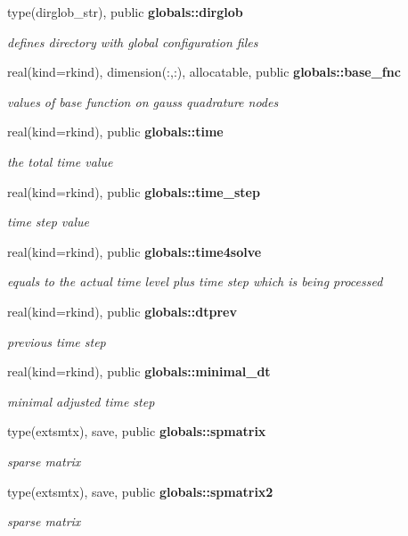 \begin{DoxyCompactItemize}
type(dirglob\+\_\+str), public {\bf globals\+::dirglob}
\begin{DoxyCompactList}\small\item\em defines directory with global configuration files \end{DoxyCompactList}\item 
real(kind=rkind), dimension(\+:,\+:), allocatable, public {\bf globals\+::base\+\_\+fnc}
\begin{DoxyCompactList}\small\item\em values of base function on gauss quadrature nodes \end{DoxyCompactList}\item 
real(kind=rkind), public {\bf globals\+::time}
\begin{DoxyCompactList}\small\item\em the total time value \end{DoxyCompactList}\item 
real(kind=rkind), public {\bf globals\+::time\+\_\+step}
\begin{DoxyCompactList}\small\item\em time step value \end{DoxyCompactList}\item 
real(kind=rkind), public {\bf globals\+::time4solve}
\begin{DoxyCompactList}\small\item\em equals to the actual time level plus time step which is being processed \end{DoxyCompactList}\item 
real(kind=rkind), public {\bf globals\+::dtprev}
\begin{DoxyCompactList}\small\item\em previous time step \end{DoxyCompactList}\item 
real(kind=rkind), public {\bf globals\+::minimal\+\_\+dt}
\begin{DoxyCompactList}\small\item\em minimal adjusted time step \end{DoxyCompactList}\item 
type(extsmtx), save, public {\bf globals\+::spmatrix}
\begin{DoxyCompactList}\small\item\em sparse matrix \end{DoxyCompactList}\item 
type(extsmtx), save, public {\bf globals\+::spmatrix2}
\begin{DoxyCompactList}\small\item\em sparse matrix \end{DoxyCompactList}\item 

\end{DoxyCompactItemize}
